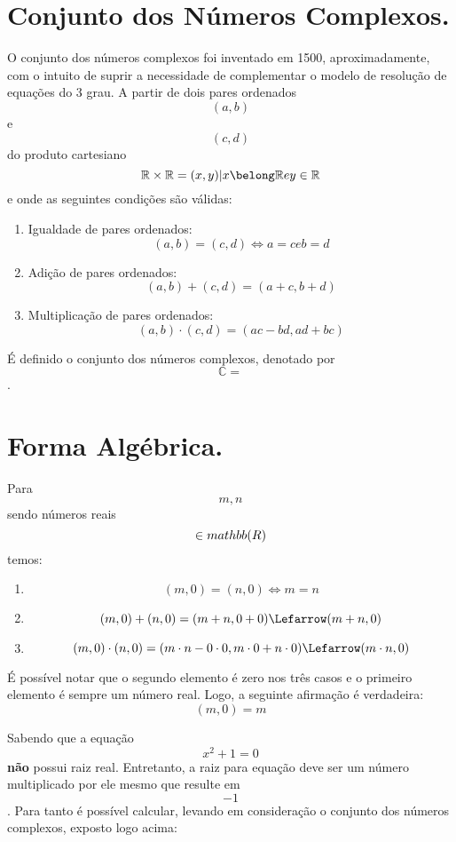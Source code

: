 \documentclass[a4paper,12pt]{article}
\begin{document}
\section{Conjunto dos Números Complexos.}

O conjunto dos números complexos foi inventado em 1500, aproximadamente, com o intuito de suprir a necessidade de complementar o modelo de resolução de equações do 3 grau.
A partir de dois pares ordenados $$(a, b)$$ e $$(c, d)$$ do produto cartesiano $$\mathbb{R} \times \mathbb{R} = {(x, y) | x \belong \mathbb{R} e y \in \mathbb{R}}$$ e onde as seguintes condições são válidas:

\begin{enumerate}
\item Igualdade de pares ordenados: $$(a, b) = (c, d) \Leftrightarrow a = c e b = d$$
\item Adição de pares ordenados: $$(a, b) + (c, d) = (a + c, b + d)$$
\item Multiplicação de pares ordenados: $$(a, b) \cdot (c, d) = (ac - bd, ad + bc)$$
\end{enumerate}

É definido o conjunto dos números complexos, denotado por $$\mathbb{C} = $$.

\section{Forma Algébrica.}

Para $$m, n$$ sendo números reais $$\in \\mathbb(R)$$ temos:
\begin{enumerate}
\item $$(m, 0) = (n, 0) \Leftrightarrow m = n$$
\item $$(m, 0) + (n, 0) = (m + n, 0 + 0) \Lefarrow (m + n, 0)$$
\item $$(m, 0) \cdot (n, 0) = (m \cdot n - 0 \cdot 0, m \cdot 0 + n \cdot 0) \Lefarrow (m \cdot n, 0)$$
\end{enumerate}

É possível notar que o segundo elemento é zero nos três casos e o primeiro elemento é sempre um número real. Logo, a seguinte afirmação é verdadeira:
$$(m, 0) = m$$

Sabendo que a equação $$x^2 + 1 = 0$$ \textbf{não} possui raiz real. Entretanto, a raiz para equação deve ser um número multiplicado por ele mesmo que resulte em $$-1$$. Para tanto é possível calcular, levando em consideração o conjunto dos números complexos, exposto logo acima:
$$$$
\end{document}
